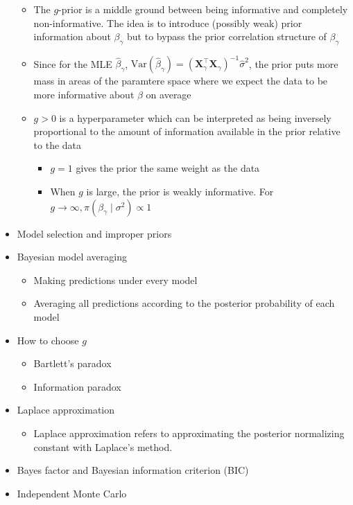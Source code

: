 \documentclass[a4paper]{article}
\begin{document}
\begin{itemize}
\begin{itemize}
        \item The $g$-prior is a middle ground between being informative and completely non-informative. The idea is to introduce (possibly weak) prior information about $\beta_{\gamma}$ but to bypass the prior correlation structure of $\beta_{\gamma}$
        \item Since for the MLE $\hat{\beta}_{\gamma}$, $\text{Var}(\hat{\beta}_{\gamma})=(\mathbf{X}_{\gamma}^{\intercal}\mathbf{X}_{\gamma})^{-1}\hat{\sigma}^2$, the prior puts more mass in areas of the paramtere space where we expect the data to be more informative about $\beta$ on average
        \item $g>0$ is a hyperparameter which can be interpreted as being inversely proportional to the amount of information available in the prior relative to the data
        \begin{itemize}
            \item $g=1$ gives the prior the same weight as the data
            \item When $g$ is large, the prior is weakly informative. For $g\to\infty, \pi(\beta_{\gamma}\mid\sigma^2)\propto 1$
        \end{itemize}
    \end{itemize}
    \item Model selection and improper priors
    \item Bayesian model averaging
    \begin{itemize}
        \item Making predictions under every model
        \item Averaging all predictions according to the posterior probability of each model
    \end{itemize}
    \item How to choose $g$
    \begin{itemize}
        \item Bartlett's paradox
        \item Information paradox
    \end{itemize}
    \item Laplace approximation
    \begin{itemize}
        \item Laplace approximation refers to approximating the posterior normalizing constant with Laplace's method.
    \end{itemize}
    \item Bayes factor and Bayesian information criterion (BIC)
    \item Independent Monte Carlo

\end{itemize}
\end{document}
